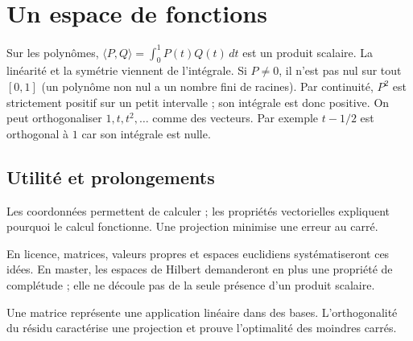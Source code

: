 \documentclass[../cours_1re.tex]{subfiles}
\begin{document}
\section{Un espace de fonctions}
Sur les polynômes, $\langle P,Q\rangle=\int_0^1P(t)Q(t)\,dt$ est un produit
scalaire. La linéarité et la symétrie viennent de l'intégrale.
Si $P\ne0$, il n'est pas nul sur tout $[0,1]$ (un polynôme non nul a
un nombre fini de racines). Par continuité, $P^2$ est strictement positif
sur un petit intervalle ; son intégrale est donc positive.
On peut orthogonaliser $1,t,t^2,\ldots$ comme des vecteurs.
Par exemple $t-1/2$ est orthogonal à $1$ car son intégrale est nulle.

\begin{finchapitre}
\section{Utilité et prolongements}
Les coordonnées permettent de calculer ; les propriétés vectorielles
expliquent pourquoi le calcul fonctionne. Une projection minimise une erreur au carré.

En licence, matrices, valeurs propres et espaces euclidiens systématiseront ces
idées. En master, les espaces de Hilbert demanderont en plus une propriété de
complétude ; elle ne découle pas de la seule présence d'un produit scalaire.
\begin{retenir}
Une matrice représente une application linéaire dans des bases.
L'orthogonalité du résidu caractérise une projection et prouve l'optimalité des moindres carrés.
\end{retenir}
\end{finchapitre}
\end{document}
